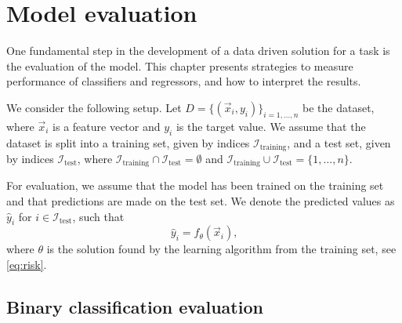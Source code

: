 \chapter{Model evaluation}
\label{chap:evaluation}


One fundamental step in the development of a data driven solution for a task is the
evaluation of the model. This chapter presents strategies to measure performance of
classifiers and regressors, and how to interpret the results.

We consider the following setup.  Let $D = \{(\vec{x}_i, y_i)\}_{i=1,\dots,n}$ be the
dataset, where $\vec{x}_i$ is a feature vector and $y_i$ is the target value.  We assume
that the dataset is split into a training set, given by indices
$\mathcal{I}_\text{training}$, and a test set, given by indices $\mathcal{I}_\text{test}$,
where $\mathcal{I}_\text{training} \cap \mathcal{I}_\text{test} = \emptyset$ and
$\mathcal{I}_\text{training} \cup \mathcal{I}_\text{test} = \{1,\dots,n\}$.

For evaluation, we assume that the model has been trained on the training set and that
predictions are made on the test set.  We denote the predicted values as $\hat{y}_i$ for
$i \in \mathcal{I}_\text{test}$, such that
\begin{equation*}
  \hat{y}_i = f_\theta(\vec{x}_i)\text{,}
\end{equation*}
where $\theta$ is the solution found by the learning algorithm from the training set, see
\cref{eq:risk}.

\section{Binary classification evaluation}

